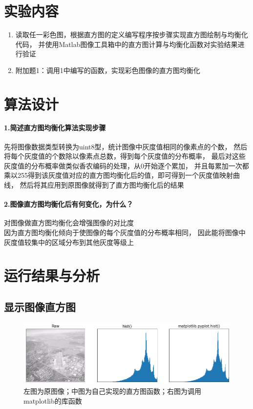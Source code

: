 \documentclass[a4paper]{ctexart}
\begin{document}
  \section{实验内容}
  \begin{enumerate}
    \item 读取任一彩色图，根据直方图的定义编写程序按步骤实现直方图绘制与均衡化代码，
    并使用Matlab图像工具箱中的直方图计算与均衡化函数对实验结果进行验证
    \item 附加题1：调用1中编写的函数，实现彩色图像的直方图均衡化
  \end{enumerate}

  \section{算法设计}
  \paragraph*{1.简述直方图均衡化算法实现步骤\\}
  先将图像数据类型转换为uint8型，统计图像中灰度值相同的像素点的个数，
  然后将每个灰度值的个数除以像素点总数，得到每个灰度值的分布概率，
  最后对这些灰度值的分布概率做类似香农编码的处理，从0开始逐个累加，
  并且每累加一次都乘以255得到该灰度值对应的直方图均衡化后的值，即可得到一个灰度值映射曲线，
  然后将其应用到原图像就得到了直方图均衡化后的结果
  \paragraph*{2.图像直方图均衡化后有何变化，为什么？\\}
  对图像做直方图均衡化会增强图像的对比度\\
  因为直方图均衡化倾向于使图像的每个灰度值的分布概率相同，
  因此能将图像中灰度值较集中的区域分布到其他灰度等级上

  \section{运行结果与分析}

  \subsection*{显示图像直方图}
  \begin{figure}[H]
    \includegraphics*[width=1.0\textwidth]{fig/hist.png}
    \caption{左图为原图像；中图为自己实现的直方图函数；右图为调用matplotlib的库函数}
  \end{figure}
\end{document}
